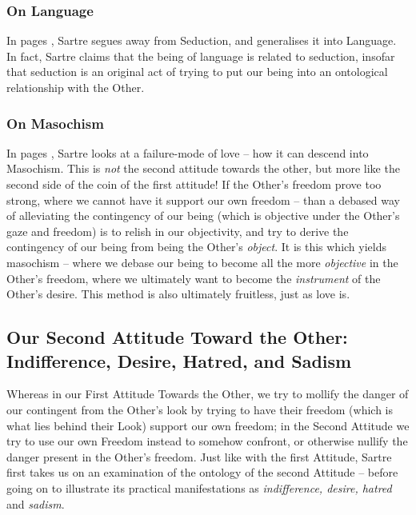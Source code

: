 \subsubsection{On Language}

In pages \autocite[493 -- 499]{sartre}, Sartre segues away from Seduction, and generalises it into Language. In fact, Sartre claims that the being of language is related to seduction, insofar that seduction is an original act of trying to put our being into an ontological relationship with the Other.

\subsubsection{On Masochism}

In pages \autocite[499 -- 501]{sartre}, Sartre looks at a failure-mode of love -- how it can descend into Masochism. This is \emph{not} the second attitude towards the other, but more like the second side of the coin of the first attitude! If the Other's freedom prove too strong, where we cannot have it support our own freedom -- than a debased way of alleviating the contingency of our being (which is objective under the Other's gaze and freedom) is to relish in our objectivity, and try to derive the contingency of our being from being the Other's \emph{object}. It is this which yields masochism -- where we debase our being to become all the more \emph{objective} in the Other's freedom, where we ultimately want to become the \emph{instrument} of the Other's desire. This method is also ultimately fruitless, just as love is.

\subsection{Our Second Attitude Toward the Other: \\ Indifference, Desire, Hatred, and Sadism}

Whereas in our First Attitude Towards the Other, we try to mollify the danger of our contingent from the Other's look by trying to have their freedom (which is what lies behind their Look) support our own freedom; in the Second Attitude we try to use our own Freedom instead to somehow confront, or otherwise nullify the danger present in the Other's freedom. Just like with the first Attitude, Sartre first takes us on an examination of the ontology of the second Attitude -- before going on to illustrate its practical manifestations as \emph{indifference, desire, hatred} and \emph{sadism}.


